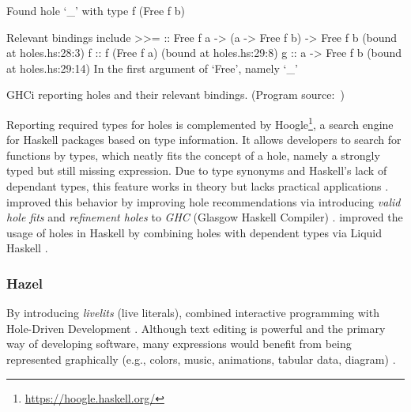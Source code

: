 \begin{program}[ht]
\begin{GenericCode}
Found hole `_' with type f (Free f b)

Relevant bindings include
  >>= :: Free f a -> (a -> Free f b) -> Free f b
    (bound at holes.hs:28:3)
  f :: f (Free f a) (bound at holes.hs:29:8)
  g :: a -> Free f b (bound at holes.hs:29:14)
In the first argument of `Free', namely `_'
\end{GenericCode}
\caption{GHCi reporting holes and their relevant bindings. (Program source:~\cite{gamari_haskell_2019})}
\label{prg:ghc-free-monad-insights}
\end{program}

Reporting required types for holes is complemented by Hoogle\footnote{\url{https://hoogle.haskell.org/}}, a search engine for Haskell packages based on type information.
It allows developers to search for functions by types, which neatly fits the concept of a hole, namely a strongly typed but still missing expression.
Due to type synonyms and Haskell's lack of dependant types, this feature works in theory but lacks practical applications \cite{gissurarson_suggesting_2018}.
\citeauthor{gissurarson_suggesting_2018} improved this behavior by improving hole recommendations via introducing \emph{valid hole fits} and \emph{refinement holes} to \emph{GHC} (Glasgow Haskell Compiler) \cite{gissurarson_suggesting_2018}.
\citeauthor{redmond_toward_2021} improved the usage of holes in Haskell by combining holes with dependent types via Liquid Haskell \cite{redmond_toward_2021}.

\subsubsection{Hazel}
By introducing \emph{livelits} (live literals), \citeauthor{omar_filling_2021} combined interactive programming with Hole-Driven Development \cite{omar_filling_2021}.
Although text editing is powerful and the primary way of developing software, many expressions would benefit from being represented graphically (e.g., colors, music, animations, tabular data, diagram) \cite{omar_filling_2021}.

